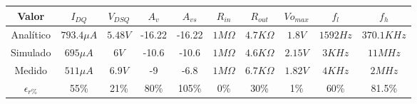\documentclass[a4paper, 10pt, spanish]{article}
\begin{document}
\begin{center}
  \begin{tabular}{|c|c|c|c|c|c|c|c|c|c|}
    \hline
    Valor & $I_{DQ}$ & $V_{DSQ}$ & $A_v$ & $A_{vs}$ & $R_{in}$ & $R_{out}$ & $V{o_{max}}$ & $f_l$ & $f_h$ \\
    \hline
    Analítico & $793.4\mu A$& $5.48V$& -16.22 & -16.22 & $1M\Omega$ & $4.7K\Omega$ & $1.8V$ & $1592Hz$ & $370.1KHz$ \\
    \hline
    Simulado & $695\mu A$ & $6V$ & -10.6 & -10.6 & $1M\Omega$ & $4.6K\Omega$ & $2.15V$ & $3KHz$ & $11MHz$ \\
    \hline
    Medido & $511\mu A$ & $6.9V$ & -9 & -6.8 & $1M\Omega$ & $6.7K\Omega$ & $1.82V$ & $4KHz$ & $2MHz$ \\
    \hline
    \hline
    $\epsilon_{r\%}$ & 55\% & 21\% & 80\% & 105\% & 0\% & 30\% & 1\% & 60\% & 81.5\% \\
    \hline
  \end{tabular}
  \label{tab:comparativo}
\end{center}


\end{document}
